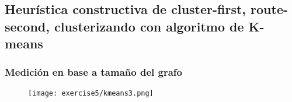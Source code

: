 \subsection{Heurística constructiva de cluster-first, route-second, clusterizando con algoritmo de K-means}

\subsubsection{Medición en base a tamaño del grafo}

\begin{figure}[H]
	\centering
	\texttt{[image: exercise5/kmeans3.png]}
\end{figure}